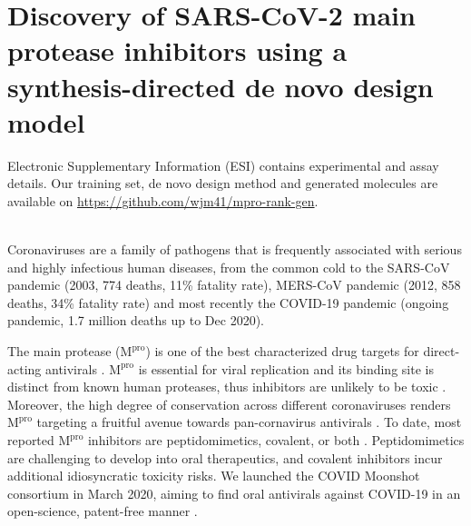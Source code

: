 
\chapter{Discovery of SARS-CoV-2 main protease inhibitors using a synthesis-directed de novo design model}
Electronic Supplementary Information (ESI) contains experimental and assay details. Our training set, de novo design method and generated molecules are available on \url{https://github.com/wjm41/mpro-rank-gen}.

\\

Coronaviruses are a family of pathogens that is frequently associated with serious and highly infectious human diseases, from the common cold to the SARS-CoV pandemic (2003, 774 deaths, 11\% fatality rate), MERS-CoV pandemic (2012, 858 deaths, 34\% fatality rate) and most recently the COVID-19 pandemic (ongoing pandemic, 1.7 million deaths up to Dec 2020).

The main protease ($\mathrm{M}^\mathrm{pro}$) is one of the best characterized drug targets for direct-acting antivirals \cite{pillaiyar2016overview,cannalire2020targeting}. $\mathrm{M}^\mathrm{pro}$ is essential for viral replication and its binding site is distinct from known human proteases, thus inhibitors are unlikely to be toxic \cite{jin2020structure,liu2020development}. Moreover, the high degree of conservation across different coronaviruses renders $\mathrm{M}^\mathrm{pro}$ targeting a fruitful avenue towards pan-cornavirus antivirals \cite{ullrich2020sars}. To date, most reported $\mathrm{M}^\mathrm{pro}$ inhibitors are peptidomimetics, covalent, or both \cite{cannalire2020targeting}. Peptidomimetics are challenging to develop into oral therapeutics, and covalent inhibitors incur additional idiosyncratic toxicity risks. We launched the COVID Moonshot consortium in March 2020, aiming to find oral antivirals against COVID-19 in an open-science, patent-free manner \cite{chodera2020crowdsourcing}. 

